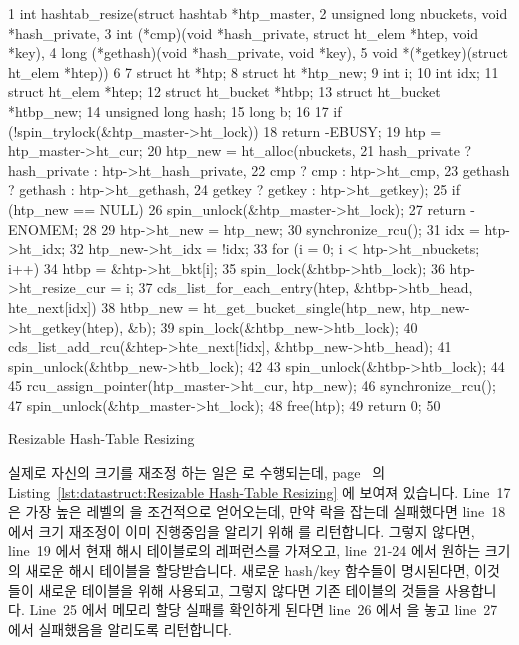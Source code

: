 \begin{listing*}[tb]
{ \scriptsize
\begin{verbbox}
 1 int hashtab_resize(struct hashtab *htp_master,
 2                    unsigned long nbuckets, void *hash_private,
 3                    int (*cmp)(void *hash_private, struct ht_elem *htep, void *key),
 4                    long (*gethash)(void *hash_private, void *key),
 5                    void *(*getkey)(struct ht_elem *htep))
 6 {
 7   struct ht *htp;
 8   struct ht *htp_new;
 9   int i;
10   int idx;
11   struct ht_elem *htep;
12   struct ht_bucket *htbp;
13   struct ht_bucket *htbp_new;
14   unsigned long hash;
15   long b;
16 
17   if (!spin_trylock(&htp_master->ht_lock))
18     return -EBUSY;
19   htp = htp_master->ht_cur;
20   htp_new = ht_alloc(nbuckets,
21                      hash_private ? hash_private : htp->ht_hash_private,
22                      cmp ? cmp : htp->ht_cmp,
23                      gethash ? gethash : htp->ht_gethash,
24                      getkey ? getkey : htp->ht_getkey);
25   if (htp_new == NULL) {
26     spin_unlock(&htp_master->ht_lock);
27     return -ENOMEM;
28   }
29   htp->ht_new = htp_new;
30   synchronize_rcu();
31   idx = htp->ht_idx;
32   htp_new->ht_idx = !idx;
33   for (i = 0; i < htp->ht_nbuckets; i++) {
34     htbp = &htp->ht_bkt[i];
35     spin_lock(&htbp->htb_lock);
36     htp->ht_resize_cur = i;
37     cds_list_for_each_entry(htep, &htbp->htb_head, hte_next[idx]) {
38       htbp_new = ht_get_bucket_single(htp_new, htp_new->ht_getkey(htep), &b);
39       spin_lock(&htbp_new->htb_lock);
40       cds_list_add_rcu(&htep->hte_next[!idx], &htbp_new->htb_head);
41       spin_unlock(&htbp_new->htb_lock);
42     }
43     spin_unlock(&htbp->htb_lock);
44   }
45   rcu_assign_pointer(htp_master->ht_cur, htp_new);
46   synchronize_rcu();
47   spin_unlock(&htp_master->ht_lock);
48   free(htp);
49   return 0;
50 }
\end{verbbox}
}
\centering
\theverbbox
\caption{Resizable Hash-Table Resizing}
\label{lst:datastruct:Resizable Hash-Table Resizing}
\end{listing*}

실제로 자신의 크기를 재조정 하는 일은  로 수행되는데,
page~\pageref{lst:datastruct:Resizable Hash-Table Resizing} 의
Listing~\ref{lst:datastruct:Resizable Hash-Table Resizing} 에 보여져 있습니다.
Line~17 은 가장 높은 레벨의  을 조건적으로 얻어오는데, 만약 락을
잡는데 실패했다면 line~18 에서 크기 재조정이 이미 진행중임을 알리기 위해
 를 리턴합니다.
그렇지 않다면, line~19 에서 현재 해시 테이블로의 레퍼런스를 가져오고,
line~21-24 에서 원하는 크기의 새로운 해시 테이블을 할당받습니다.
새로운 hash/key 함수들이 명시된다면, 이것들이 새로운 테이블을 위해 사용되고,
그렇지 않다면 기존 테이블의 것들을 사용합니다.
Line~25 에서 메모리 할당 실패를 확인하게 된다면 line~26 에서  을
놓고 line~27 에서 실패했음을 알리도록 리턴합니다.
\iffalse

